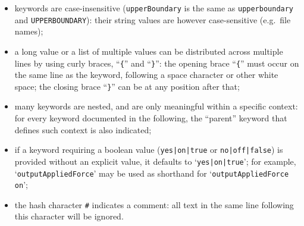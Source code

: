 \begin{itemize}

\item keywords are case-insensitive (\texttt{upperBoundary} is the same as \texttt{upperboundary} and \texttt{UPPERBOUNDARY}): their string values are however case-sensitive (e.g.~file names);

\item a long value or a list of multiple values can be distributed across multiple lines by using curly braces, ``\texttt{\{}'' and ``\texttt{\}}'': the opening brace ``\texttt{\{}'' must occur on the same line as the keyword, following a space character or other white space; the closing brace ``\texttt{\}}'' can be at any position after that;

\item many keywords are nested, and are only meaningful within a specific context: for every keyword documented in the following, the ``parent'' keyword that defines such context is also indicated;



\item if a keyword requiring a boolean value (\texttt{yes|on|true} or \texttt{no|off|false}) is provided without an explicit value, it defaults to `\texttt{yes|on|true}'; for example, `\texttt{outputAppliedForce}' may be used as shorthand for `\texttt{outputAppliedForce on}';

\item the hash character \texttt{\#} indicates a comment: all text in the same line following this character will be ignored.

\end{itemize}

